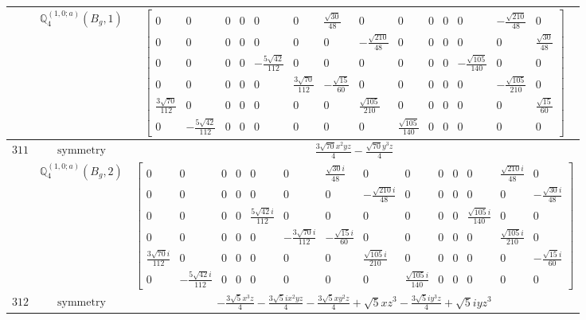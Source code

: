 \documentclass[fleqn,8pt,landscape]{jsarticle}
\begin{document}
\begin{longtable}{ccc}
$  $ & $ \mathbb{Q}_{4}^{(1,0;a)}(B_{g},1) $ & $ \begin{bmatrix} 0 & 0 & 0 & 0 & 0 & 0 & \frac{\sqrt{30}}{48} & 0 & 0 & 0 & 0 & 0 & - \frac{\sqrt{210}}{48} & 0 \\ 0 & 0 & 0 & 0 & 0 & 0 & 0 & - \frac{\sqrt{210}}{48} & 0 & 0 & 0 & 0 & 0 & \frac{\sqrt{30}}{48} \\ 0 & 0 & 0 & 0 & - \frac{5 \sqrt{42}}{112} & 0 & 0 & 0 & 0 & 0 & 0 & - \frac{\sqrt{105}}{140} & 0 & 0 \\ 0 & 0 & 0 & 0 & 0 & \frac{3 \sqrt{70}}{112} & - \frac{\sqrt{15}}{60} & 0 & 0 & 0 & 0 & 0 & - \frac{\sqrt{105}}{210} & 0 \\ \frac{3 \sqrt{70}}{112} & 0 & 0 & 0 & 0 & 0 & 0 & \frac{\sqrt{105}}{210} & 0 & 0 & 0 & 0 & 0 & \frac{\sqrt{15}}{60} \\ 0 & - \frac{5 \sqrt{42}}{112} & 0 & 0 & 0 & 0 & 0 & 0 & \frac{\sqrt{105}}{140} & 0 & 0 & 0 & 0 & 0 \end{bmatrix} $ \\ \hline
$ 311 $ & $ \text{symmetry} $ & $ \frac{3 \sqrt{70} x^{2} y z}{4} - \frac{\sqrt{70} y^{3} z}{4} $ \\
$  $ & $ \mathbb{Q}_{4}^{(1,0;a)}(B_{g},2) $ & $ \begin{bmatrix} 0 & 0 & 0 & 0 & 0 & 0 & \frac{\sqrt{30} i}{48} & 0 & 0 & 0 & 0 & 0 & \frac{\sqrt{210} i}{48} & 0 \\ 0 & 0 & 0 & 0 & 0 & 0 & 0 & - \frac{\sqrt{210} i}{48} & 0 & 0 & 0 & 0 & 0 & - \frac{\sqrt{30} i}{48} \\ 0 & 0 & 0 & 0 & \frac{5 \sqrt{42} i}{112} & 0 & 0 & 0 & 0 & 0 & 0 & \frac{\sqrt{105} i}{140} & 0 & 0 \\ 0 & 0 & 0 & 0 & 0 & - \frac{3 \sqrt{70} i}{112} & - \frac{\sqrt{15} i}{60} & 0 & 0 & 0 & 0 & 0 & \frac{\sqrt{105} i}{210} & 0 \\ \frac{3 \sqrt{70} i}{112} & 0 & 0 & 0 & 0 & 0 & 0 & \frac{\sqrt{105} i}{210} & 0 & 0 & 0 & 0 & 0 & - \frac{\sqrt{15} i}{60} \\ 0 & - \frac{5 \sqrt{42} i}{112} & 0 & 0 & 0 & 0 & 0 & 0 & \frac{\sqrt{105} i}{140} & 0 & 0 & 0 & 0 & 0 \end{bmatrix} $ \\ \hline
$ 312 $ & $ \text{symmetry} $ & $ - \frac{3 \sqrt{5} x^{3} z}{4} - \frac{3 \sqrt{5} i x^{2} y z}{4} - \frac{3 \sqrt{5} x y^{2} z}{4} + \sqrt{5} x z^{3} - \frac{3 \sqrt{5} i y^{3} z}{4} + \sqrt{5} i y z^{3} $ \\

\end{longtable}
\end{document}
